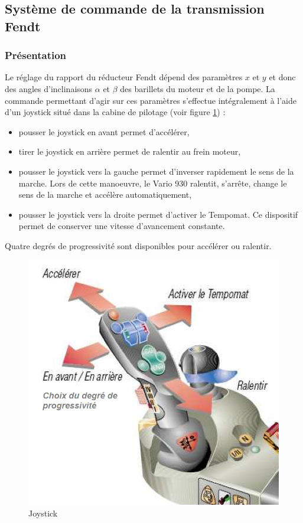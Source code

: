 \subsection{Système de commande de la transmission Fendt}

\subsubsection{Présentation}

Le réglage du rapport du réducteur Fendt dépend des paramètres $x$ et $y$ et donc des angles d'inclinaisons $\alpha$ et $\beta$ des barillets du moteur et de la pompe. La commande permettant d'agir sur ces paramètres s'effectue intégralement à l'aide d'un joystick situé dans la cabine de pilotage (voir figure \ref{fig19}) :
\begin{itemize}
 \item pousser le joystick en avant permet d'accélérer,
 \item tirer le joystick en arrière permet de ralentir au frein moteur,
 \item pousser le joystick vers la gauche permet d'inverser rapidement le sens de la marche. Lors de cette manoeuvre, le Vario 930 ralentit, s'arrête, change le sens de la marche et accélère automatiquement,
 \item pousser le joystick vers la droite permet d'activer le Tempomat. Ce dispositif permet de conserver une vitesse d'avancement constante.
\end{itemize}

Quatre degrés de progressivité sont disponibles pour accélérer ou ralentir.

\begin{figure}[!h]
\centering\includegraphics[width=0.5\linewidth]{img/Tracteur19.png}
\caption{Joystick}
\label{fig19}
\end{figure}

